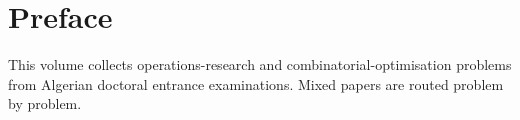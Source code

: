 \documentclass[print]{docmathdz}
\begin{document}
\chapter*{Preface}
This volume collects operations-research and combinatorial-optimisation problems from Algerian doctoral entrance examinations. Mixed papers are routed problem by problem.
\mainmatter


\backmatter\printbibliography[heading=bibintoc,title={References}]\printindex
\end{document}
